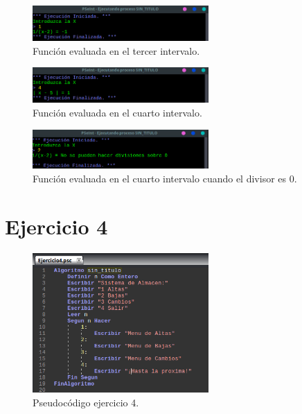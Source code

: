 \documentclass[11pt, a4paper]{report}
\begin{document}
\begin{figure}[!ht]
\begin{center}
  \includegraphics[width=0.6\textwidth]{respuesta7.png}
  \caption{Funci\'on evaluada en el tercer intervalo.}
\end{center}
\end{figure} 

\begin{figure}[!ht]
\begin{center}
  \includegraphics[width=0.6\textwidth]{respuesta9.png}
  \caption{Funci\'on evaluada en el cuarto intervalo.}
\end{center}
\end{figure} 

\begin{figure}[!ht]
\begin{center}
  \includegraphics[width=0.6\textwidth]{respuesta8.png}
  \caption{Funci\'on evaluada en el cuarto intervalo cuando el divisor es 0.}
\end{center}
\end{figure} 

\newpage
\section*{Ejercicio 4}

\begin{figure}[!ht]
\begin{center}
  \includegraphics[width=0.6\textwidth]{ejercicio4.png}
  \caption{Pseudoc\'odigo ejercicio 4.}
\end{center}
\end{figure}
\end{document}
